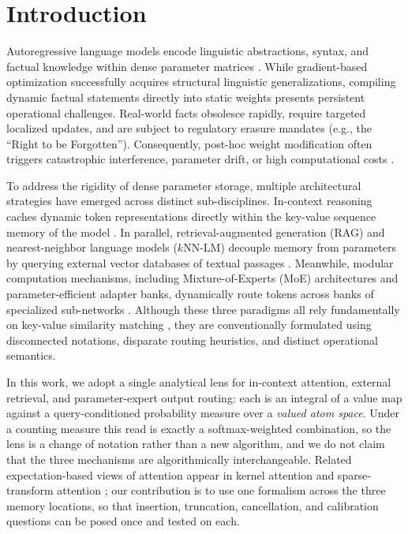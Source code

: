 \documentclass[preprint,12pt]{elsarticle}
\begin{document}
\linenumbers

\section{Introduction}
\label{sec:intro}

Autoregressive language models encode linguistic abstractions, syntax, and factual knowledge within dense parameter matrices \cite{vaswani2017attention, brown2020language, geva2021transformer}. While gradient-based optimization successfully acquires structural linguistic generalizations, compiling dynamic factual statements directly into static weights presents persistent operational challenges. Real-world facts obsolesce rapidly, require targeted localized updates, and are subject to regulatory erasure mandates (e.g., the ``Right to be Forgotten''). Consequently, post-hoc weight modification often triggers catastrophic interference, parameter drift, or high computational costs \cite{meng2022locating, meng2023mass}.

To address the rigidity of dense parameter storage, multiple architectural strategies have emerged across distinct sub-disciplines. In-context reasoning caches dynamic token representations directly within the key-value sequence memory of the model \cite{vaswani2017attention}. In parallel, retrieval-augmented generation (RAG) and nearest-neighbor language models ($k$NN-LM) decouple memory from parameters by querying external vector databases of textual passages \cite{lewis2020rag, khandelwal2020generalization, borgeaud2022improving}. Meanwhile, modular computation mechanisms, including Mixture-of-Experts (MoE) architectures and parameter-efficient adapter banks, dynamically route tokens across banks of specialized sub-networks \cite{shazeer2017outrageously, hu2021lora, jiang2024mixtral}. Although these three paradigms all rely fundamentally on key-value similarity matching \cite{geva2021transformer, lample2019large, tsai2019transformer}, they are conventionally formulated using disconnected notations, disparate routing heuristics, and distinct operational semantics.

In this work, we adopt a single analytical lens for in-context attention, external retrieval, and parameter-expert output routing: each is an integral of a value map against a query-conditioned probability measure over a \emph{valued atom space}. Under a counting measure this read is exactly a softmax-weighted combination, so the lens is a change of notation rather than a new algorithm, and we do not claim that the three mechanisms are algorithmically interchangeable. Related expectation-based views of attention appear in kernel attention \cite{tsai2019transformer} and sparse-transform attention \cite{martins2020sparse}; our contribution is to use one formalism across the three memory locations, so that insertion, truncation, cancellation, and calibration questions can be posed once and tested on each.
\end{document}
